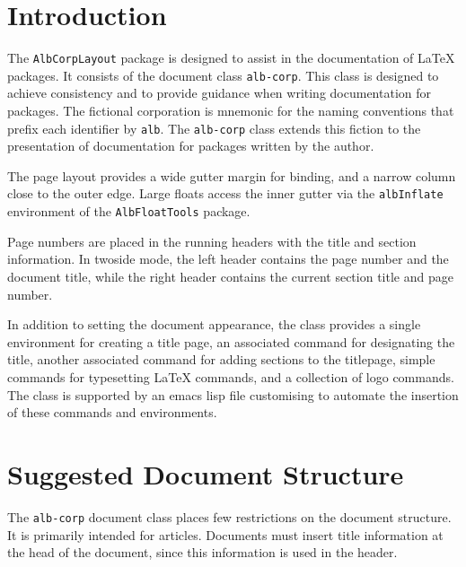 \documentclass[11pt,a4paper,oneside,titlepage]{alb-corp}
\begin{document}

\section{Introduction}
\label{sec:alb-corp-layout-examples:intr}

The \texttt{AlbCorpLayout} package is designed to assist in the
documentation of \LaTeX{} packages.  It consists of the document class
\texttt{alb-corp}.  This class is designed to achieve consistency and to
provide guidance when writing documentation for \albLogo{} packages.
The fictional \albLogo{} corporation is mnemonic for the naming
conventions that prefix each identifier by \texttt{alb}.  The
\texttt{alb-corp} class extends this fiction to the presentation of
documentation for packages written by the author.

The page layout provides a wide gutter margin for binding, and a narrow
column close to the outer edge.  Large floats access the inner gutter
via the \texttt{albInflate} environment of the \texttt{AlbFloatTools}
package.

Page numbers are placed in the running headers with the title and
section information.  In twoside mode, the left header contains the page
number and the document title, while the right header contains the
current section title and page number.

In addition to setting the document appearance, the class provides a
single environment for creating a title page, an associated command for
designating the title, another associated command for adding sections to
the titlepage, simple commands for typesetting \LaTeX{} commands, and a
collection of logo commands.  The class is supported by an emacs lisp
file customising \AUCTeX{} to automate the insertion of these commands
and environments.




\section{Suggested Document Structure}
\label{sec:alb-corp-layout-documentation:sugg-docum-struct}

The \texttt{alb-corp} document class places few restrictions on the
document structure.  It is primarily intended for articles.  Documents
must insert title information at the head of the document, since this
information is used in the header.
\end{document}
